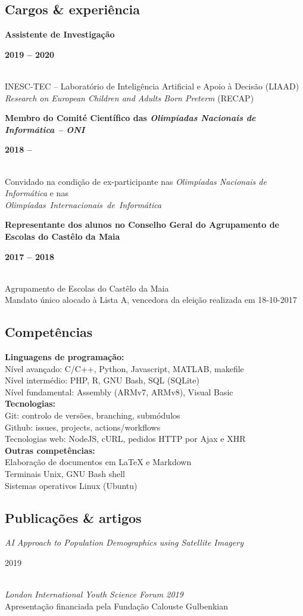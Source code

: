 \documentclass[8pt]{extarticle}
\newcommand{\parag}[1]{
\begin{minipage}{\textwidth} \hfill
\begin{minipage}{\dimexpr\textwidth-0.6cm}
	#1
\end{minipage}
\end{minipage}
}
\newcommand{\itemtime}[2]{
#1 \hfill \begin{minipage}[t]{0.185\textwidth}         #2  \end{minipage}
}
\newcommand{\job}[3]{\parag{
\itemtime{\textbf{#1}}{\textbf{#2}}\\
#3 \vspace*{9px}}}
\newcommand{\pub}[3]{\parag{
\itemtime{\textit{#1}}{#2}\\
#3 \vspace*{9px}}}
\begin{document}
\subsection*{Cargos \& experiência}
\job{Assistente de Investigação}{2019 – 2020}{
INESC-TEC – Laboratório de Inteligência Artificial e Apoio à Decisão (LIAAD)\\
\textit{Research on European Children and Adults Born Preterm} (RECAP)
}
\job{Membro do Comité Científico das \textit{Olimpíadas Nacionais de Informática – ONI}}{2018 – }{
Convidado na condição de ex-participante nas \textit{Olimpíadas Nacionais de Informática} e nas \\
\mbox{\textit{Olimpíadas Internacionais de Informática}}
}
\job{Representante dos alunos no Conselho Geral do Agrupamento de Escolas do Castêlo da Maia}{2017 – 2018}{
Agrupamento de Escolas do Castêlo da Maia\\
Mandato único alocado à Lista A, vencedora da eleição realizada em 18-10-2017
}
\subsection*{Competências}
\parag{
\textbf{Linguagens de programação:}\\
Nível avançado: C/C++, Python, Javascript, MATLAB, makefile\\
Nível intermédio: PHP, R, GNU Bash, SQL (SQLite)\\
Nível fundamental: Assembly (ARMv7, ARMv8), Visual Basic\\ 
\textbf{Tecnologias:}\\
Git: controlo de versões, branching, submódulos\\
Github: issues, projects, actions/workflows\\
Tecnologias web: NodeJS, cURL, pedidos HTTP por Ajax e XHR\\
\textbf{Outras competências:}\\
Elaboração de documentos em LaTeX e Markdown\\
Terminais Unix, GNU Bash shell\\
Sistemas operativos Linux (Ubuntu)
}
\subsection*{Publicações \& artigos}
\pub{AI Approach to Population Demographics using Satellite Imagery}{2019}{
\textit{London International Youth Science Forum 2019}\\
Apresentação financiada pela Fundação Calouste Gulbenkian
}
\end{document}
